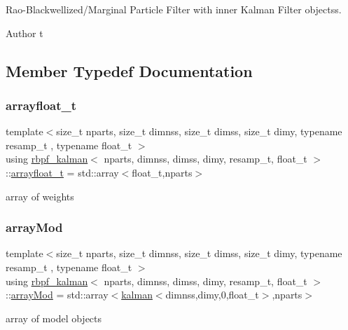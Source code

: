 Rao-\/\+Blackwellized/\+Marginal Particle Filter with inner Kalman Filter objectss. 

\begin{DoxyAuthor}{Author}
t 
\end{DoxyAuthor}


\subsection{Member Typedef Documentation}
\mbox{\label{classrbpf__kalman_a77493b35e7848d5bd91904701adabbbc}} 
\subsubsection{\texorpdfstring{arrayfloat\+\_\+t}{arrayfloat\_t}}
{\footnotesize\ttfamily template$<$size\+\_\+t nparts, size\+\_\+t dimnss, size\+\_\+t dimss, size\+\_\+t dimy, typename resamp\+\_\+t , typename float\+\_\+t $>$ \\
using \hyperlink{classrbpf__kalman}{rbpf\+\_\+kalman}$<$ nparts, dimnss, dimss, dimy, resamp\+\_\+t, float\+\_\+t $>$\+::\hyperlink{classrbpf__kalman_a77493b35e7848d5bd91904701adabbbc}{arrayfloat\+\_\+t} =  std\+::array$<$float\+\_\+t,nparts$>$}

array of weights \mbox{\label{classrbpf__kalman_a99e5cb365f01f83962440f29357744d9}} 
\subsubsection{\texorpdfstring{array\+Mod}{arrayMod}}
{\footnotesize\ttfamily template$<$size\+\_\+t nparts, size\+\_\+t dimnss, size\+\_\+t dimss, size\+\_\+t dimy, typename resamp\+\_\+t , typename float\+\_\+t $>$ \\
using \hyperlink{classrbpf__kalman}{rbpf\+\_\+kalman}$<$ nparts, dimnss, dimss, dimy, resamp\+\_\+t, float\+\_\+t $>$\+::\hyperlink{classrbpf__kalman_a99e5cb365f01f83962440f29357744d9}{array\+Mod} =  std\+::array$<$\hyperlink{classkalman}{kalman}$<$dimnss,dimy,0,float\+\_\+t$>$,nparts$>$}

array of model objects \mbox{\label{classrbpf__kalman_ad0c2ef4db6363157244741517daae136}} 
